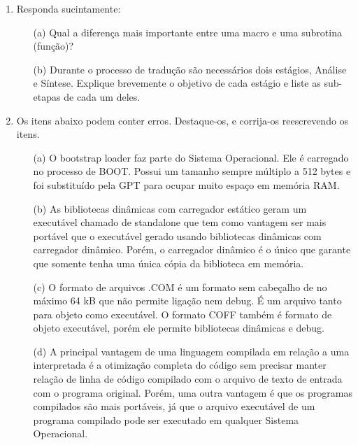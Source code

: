 \begin{enumerate}

    \item 
    Responda sucintamente:
    \begin{itemize}
        \item [(a)]
        Qual a diferença mais importante entre uma macro 
        e uma subrotina (função)?

        \item [(b)]
        Durante o processo de tradução são necessários dois estágios,
        Análise e Síntese. Explique brevemente o objetivo de cada estágio
        e liste as sub-etapas de cada um deles.        
    \end{itemize}

    \item 
    Os itens abaixo podem conter erros.
    Destaque-os, e corrija-os reescrevendo os itens.
    \begin{itemize}
        \item [(a)]
        O bootstrap loader faz parte do Sistema Operacional.
        Ele é carregado no processo de BOOT.
        Possui um tamanho sempre múltiplo a 512 bytes 
        e foi substituído pela GPT para ocupar muito espaço em memória RAM.

        \item [(b)]
        As bibliotecas dinâmicas com carregador estático 
        geram um executável chamado de standalone que tem como vantagem
        ser mais portável que o executável gerado usando 
        bibliotecas dinâmicas com carregador dinâmico.
        Porém, o carregador dinâmico é o único que garante que 
        somente tenha uma única cópia da biblioteca em memória.

        \item [(c)]
        O formato de arquivos .COM é um formato sem cabeçalho 
        de no máximo 64 kB que não permite ligação nem debug.
        É um arquivo tanto para objeto como executável.
        O formato COFF também é formato de objeto executável,
        porém ele permite bibliotecas dinâmicas e debug.

        \item [(d)]
        A principal vantagem de uma linguagem compilada em relação
        a uma interpretada é a otimização completa do código 
        sem precisar manter relação de linha de código compilado
        com o arquivo de texto de entrada com o programa original.
        Porém, uma outra vantagem é que os programas compilados
        são mais portáveis, já que o arquivo executável de um programa
        compilado pode ser executado em qualquer Sistema Operacional.
    \end{itemize}


\end{enumerate}
